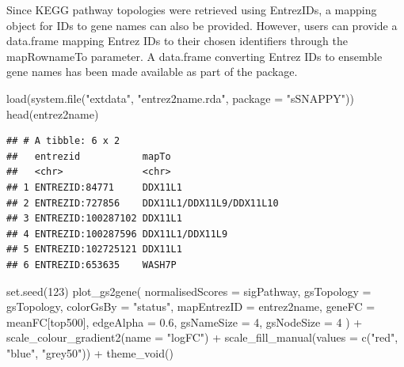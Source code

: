 \documentclass[9pt,a4paper,]{extarticle}
\newenvironment{Shaded}{\begin{snugshade}}{\end{snugshade}}
\newcommand{\AttributeTok}[1]{\textcolor[rgb]{0.77,0.63,0.00}{#1}}
\newcommand{\DecValTok}[1]{\textcolor[rgb]{0.00,0.00,0.81}{#1}}
\newcommand{\FloatTok}[1]{\textcolor[rgb]{0.00,0.00,0.81}{#1}}
\newcommand{\FunctionTok}[1]{\textcolor[rgb]{0.00,0.00,0.00}{#1}}
\newcommand{\NormalTok}[1]{#1}
\newcommand{\SpecialCharTok}[1]{\textcolor[rgb]{0.00,0.00,0.00}{#1}}
\newcommand{\StringTok}[1]{\textcolor[rgb]{0.31,0.60,0.02}{#1}}
\begin{document}
Since KEGG pathway topologies were retrieved using EntrezIDs, a mapping object for IDs to gene names can also be provided.
However, users can provide a data.frame mapping Entrez IDs to their chosen identifiers through the mapRownameTo parameter.
A data.frame converting Entrez IDs to ensemble gene names has been made available as part of the package.

\begin{Shaded}
\begin{Highlighting}[]
\FunctionTok{load}\NormalTok{(}\FunctionTok{system.file}\NormalTok{(}\StringTok{"extdata"}\NormalTok{, }\StringTok{"entrez2name.rda"}\NormalTok{, }\AttributeTok{package =} \StringTok{"sSNAPPY"}\NormalTok{))}
\FunctionTok{head}\NormalTok{(entrez2name)}
\end{Highlighting}
\end{Shaded}

\begin{verbatim}
## # A tibble: 6 x 2
##   entrezid           mapTo                   
##   <chr>              <chr>                   
## 1 ENTREZID:84771     DDX11L1                 
## 2 ENTREZID:727856    DDX11L1/DDX11L9/DDX11L10
## 3 ENTREZID:100287102 DDX11L1                 
## 4 ENTREZID:100287596 DDX11L1/DDX11L9         
## 5 ENTREZID:102725121 DDX11L1                 
## 6 ENTREZID:653635    WASH7P
\end{verbatim}

\begin{Shaded}
\begin{Highlighting}[]
\FunctionTok{set.seed}\NormalTok{(}\DecValTok{123}\NormalTok{)}
\FunctionTok{plot\_gs2gene}\NormalTok{(}
  \AttributeTok{normalisedScores =}\NormalTok{ sigPathway, }
  \AttributeTok{gsTopology =}\NormalTok{ gsTopology, }
  \AttributeTok{colorGsBy =} \StringTok{"status"}\NormalTok{, }
  \AttributeTok{mapEntrezID =}\NormalTok{ entrez2name, }
  \AttributeTok{geneFC =}\NormalTok{ meanFC[top500], }
  \AttributeTok{edgeAlpha =} \FloatTok{0.6}\NormalTok{, }
  \AttributeTok{gsNameSize =} \DecValTok{4}\NormalTok{, }\AttributeTok{gsNodeSize =} \DecValTok{4}
\NormalTok{) }\SpecialCharTok{+}
  \FunctionTok{scale\_colour\_gradient2}\NormalTok{(}\AttributeTok{name =} \StringTok{"logFC"}\NormalTok{) }\SpecialCharTok{+}
  \FunctionTok{scale\_fill\_manual}\NormalTok{(}\AttributeTok{values =} \FunctionTok{c}\NormalTok{(}\StringTok{"red"}\NormalTok{, }\StringTok{"blue"}\NormalTok{, }\StringTok{"grey50"}\NormalTok{)) }\SpecialCharTok{+}
  \FunctionTok{theme\_void}\NormalTok{()}
\end{Highlighting}
\end{Shaded}
\end{document}
